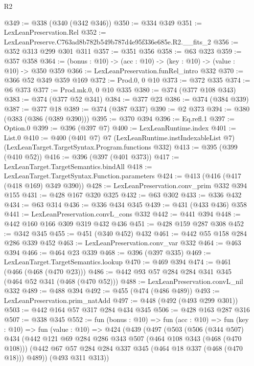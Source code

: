 \begin{lexlean}{R2}
\begin{coremodule}
@349 := @338 (@340 (@342 @346))
@350 := @334 @349
@351 := LexLeanPreservation.Rel
@352 := LexLeanPreserve.C763ad8b782b549b787d4e95f336e685e.R2.__fits_2
@356 := @352 @313 @299 @301 @311
@357 := @351 @356
@358 := @63 @323
@359 := @357 @358
@364 := (bonus : @10) -> (acc : @10) -> (key : @10) -> (value : @10) -> @350 @359
@366 := LexLeanPreservation.funRel_intro @332
@370 := @366 @52 @349 @359 @169
@372 := Prod.{0, 0} @10
@373 := @372 @335
@374 := @6 @373
@377 := Prod.mk.{0, 0} @10 @335
@380 := @374 (@377 @108 @343)
@383 := @374 (@377 @52 @341)
@384 := @377 @23
@386 := @374 (@384 @339)
@387 := @377 @18
@389 := @374 (@387 @337)
@390 := @2 @373
@394 := @380 (@383 (@386 (@389 @390)))
@395 := @370 @394
@396 := Eq.refl.{1}
@397 := Option.{0}
@399 := @396 (@397 @7)
@400 := LexLeanRuntime.index
@401 := List.{0}
@410 := @400
    (@401 @7)
    @7
    (LexLeanRuntime.instIndexableList @7)
    (LexLeanTarget.TargetSyntax.Program.functions @332)
@413 := @395 (@399 (@410 @52))
@416 := @396 (@397 (@401 @373))
@417 := LexLeanTarget.TargetSemantics.bindAll
@418 := LexLeanTarget.TargetSyntax.Function.parameters
@424 := @413 (@416 (@417 (@418 @169) @349 @390))
@428 := LexLeanPreservation.conv_prim @332 @394 @155
@431 := @428 @167 @320 @325
@432 := @63 @302
@433 := @336 @432
@434 := @63 @314
@436 := @336 @434 @345
@439 := @431 (@433 @436) @358
@441 := LexLeanPreservation.convL_cons @332
@442 := @441 @394
@448 := @442 @160 @166 @309 @319 @432 @436
@451 := @428 @159 @287 @308
@452 := @342 @345
@455 := @451 (@340 @452) @432
@461 := @442 @55 @158 @284 @286 @339 @452
@463 := LexLeanPreservation.conv_var @332
@464 := @463 @394
@466 := @464 @23 @339
@468 := @396 (@397 @335)
@469 := LexLeanTarget.TargetSemantics.lookup
@470 := @469 @394
@474 := @461 (@466 (@468 (@470 @23)))
@486 := @442 @93 @57 @284 @284 @341 @345 (@464 @52 @341 (@468 (@470 @52)))
@488 := LexLeanPreservation.convL_nil @332
@489 := @488 @394
@492 := @455 (@474 (@486 @489))
@493 := LexLeanPreservation.prim_natAdd
@497 := @448 (@492 (@493 @299 @301))
@503 := @442 @164 @57 @317 @284 @434 @345
@506 := @428 @163 @287 @316
@507 := @338 @345
@552 := fun (bonus : @10) =>
  fun (acc : @10) =>
  fun (key : @10) =>
  fun (value : @10) =>
  @424
    (@439
      (@497
        (@503
          (@506
            (@344 @507)
            @434
            (@442
              @121
              @69
              @284
              @286
              @343
              @507
              (@464 @108 @343 (@468 (@470 @108)))
              (@442 @67 @57 @284 @284 @337 @345 (@464 @18 @337 (@468 (@470 @18))) @489))
            (@493 @311 @313))

\end{coremodule}
\end{lexlean}

